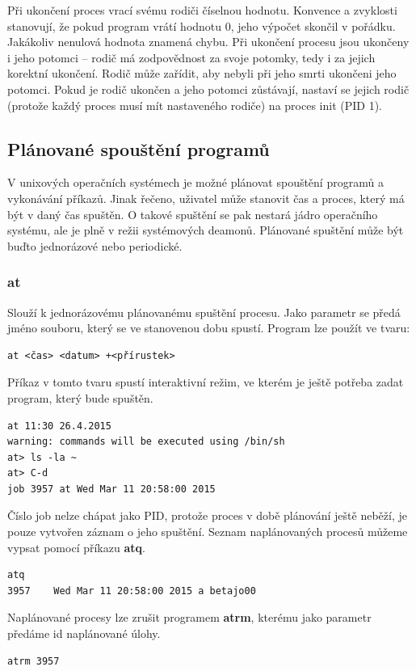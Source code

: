 \documentclass{article}
\begin{document}
Při ukončení proces vrací svému rodiči číselnou hodnotu. Konvence a zvyklosti stanovují, že pokud program vrátí hodnotu 0, jeho výpočet skončil v pořádku. Jakákoliv nenulová hodnota znamená chybu. Při ukončení procesu jsou ukončeny i jeho potomci -- rodič má zodpovědnost za svoje potomky, tedy i za jejich korektní ukončení. Rodič může zařídit, aby nebyli při jeho smrti ukončeni jeho potomci. Pokud je rodič ukončen a jeho potomci zůstávají, nastaví se jejich rodič (protože každý proces musí mít nastaveného rodiče) na proces init (PID 1).

\subsection{Plánované spouštění programů}
V unixových operačních systémech je možné plánovat spouštění programů a vykonávání příkazů. Jinak řečeno, uživatel může stanovit čas a proces, který má být v daný čas spuštěn. O takové spuštění se pak nestará jádro operačního systému, ale je plně v režii systémových deamonů. Plánované spuštění může být buďto jednorázové nebo periodické.
\subsubsection{at}
Slouží k jednorázovému plánovanému spuštění procesu. Jako parametr se předá jméno souboru, který se ve stanovenou dobu spustí. Program lze použít ve tvaru: \begin{verbatim}
at <čas> <datum> +<přírustek>
\end{verbatim}
Příkaz v tomto tvaru spustí interaktivní režim, ve kterém je ještě potřeba zadat program, který bude spuštěn.
\begin{verbatim}
at 11:30 26.4.2015
warning: commands will be executed using /bin/sh
at> ls -la ~
at> C-d
job 3957 at Wed Mar 11 20:58:00 2015
\end{verbatim}
Číslo job nelze chápat jako PID, protože proces v době plánování ještě neběží, je pouze vytvořen záznam o jeho spuštění. Seznam naplánovaných procesů můžeme vypsat pomocí příkazu \textbf{atq}.
\begin{verbatim}
atq
3957    Wed Mar 11 20:58:00 2015 a betajo00
\end{verbatim}
Naplánované procesy lze zrušit programem \textbf{atrm}, kterému jako parametr předáme id naplánované úlohy.
\begin{verbatim}
atrm 3957
\end{verbatim}
\end{document}

